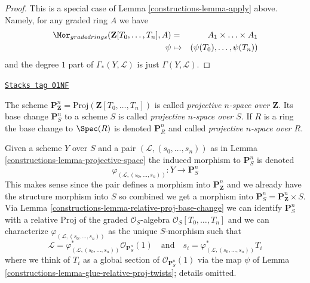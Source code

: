 \begin{proof}

This is a special case of Lemma \ref{constructions-lemma-apply} above.
Namely, for any graded ring $A$ we have
\begin{eqnarray*}
\Mor_{graded rings}(\mathbf{Z}[T_0, \ldots, T_n], A)
& = &
A_1 \times \ldots \times A_1 \\
\psi & \mapsto & (\psi(T_0), \ldots, \psi(T_n))
\end{eqnarray*}
and the degree $1$ part of $\Gamma_*(Y, \mathcal{L})$ is
just $\Gamma(Y, \mathcal{L})$.
\end{proof}

\begin{definition}
\label{constructions-definition-projective-space}
\href{https://stacks.math.columbia.edu/tag/01NF}{\texttt{Stacks tag 01NF}}

The scheme
$\mathbf{P}^n_{\mathbf{Z}} = \text{Proj}(\mathbf{Z}[T_0, \ldots, T_n])$
is called {\it projective $n$-space over $\mathbf{Z}$}.
Its base change $\mathbf{P}^n_S$ to a scheme $S$ is called
{\it projective $n$-space over $S$}. If $R$ is a ring the base change
to $\Spec(R)$ is denoted $\mathbf{P}^n_R$ and called
{\it projective $n$-space over $R$}.
\end{definition}

Given a scheme $Y$ over $S$
and a pair $(\mathcal{L}, (s_0, \ldots, s_n))$ as in
Lemma \ref{constructions-lemma-projective-space}
the induced morphism to $\mathbf{P}^n_S$ is denoted
$$
\varphi_{(\mathcal{L}, (s_0, \ldots, s_n))} :
Y \longrightarrow \mathbf{P}^n_S
$$
This makes sense since the pair defines a morphism into
$\mathbf{P}^n_{\mathbf{Z}}$ and we already have the structure
morphism into $S$ so combined we get a morphism into
$\mathbf{P}^n_S = \mathbf{P}^n_{\mathbf{Z}} \times S$.
Via Lemma \ref{constructions-lemma-relative-proj-base-change}
we can identify $\mathbf{P}^n_S$ with a relative Proj of
the graded $\mathcal{O}_S$-algebra $\mathcal{O}_S[T_0, \ldots, T_n]$
and we can characterize $\varphi_{(\mathcal{L}, (s_0, \ldots, s_n))}$
as the unique $S$-morphism such that
$$
\mathcal{L} =
\varphi_{(\mathcal{L}, (s_0, \ldots, s_n))}^*\mathcal{O}_{\mathbf{P}^n_S}(1)
\quad
\text{and}
\quad
s_i = \varphi_{(\mathcal{L}, (s_0, \ldots, s_n))}^*T_i
$$
where we think of $T_i$ as a global section of
$\mathcal{O}_{\mathbf{P}^n_S}(1)$ via the map $\psi$ of
Lemma \ref{constructions-lemma-glue-relative-proj-twists}; details omitted.

